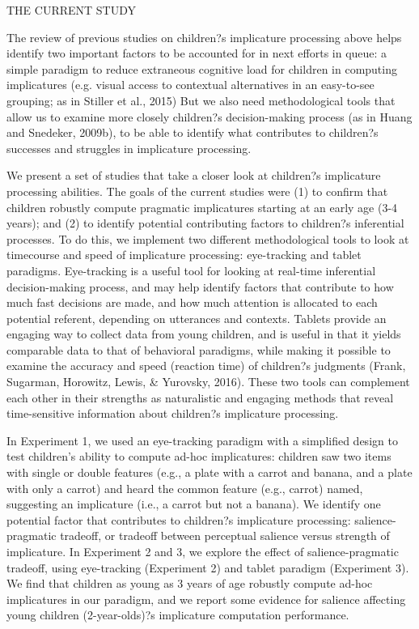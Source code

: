 THE CURRENT STUDY

The review of previous studies on children?s implicature processing above helps identify two important factors to be accounted for in next efforts in queue: a simple paradigm to reduce extraneous cognitive load for children in computing implicatures (e.g. visual access to contextual alternatives in an easy-to-see grouping; as in Stiller et al., 2015) But we also need methodological tools that allow us to examine more closely children?s decision-making process (as in Huang and Snedeker, 2009b), to be able to identify what contributes to children?s successes and struggles in implicature processing. 

We present a set of studies that take a closer look at children?s implicature processing abilities. The goals of the current studies were (1) to confirm that children robustly compute pragmatic implicatures starting at an early age (3-4 years); and (2) to identify potential contributing factors to children?s inferential processes. To do this, we implement two different methodological tools to look at timecourse and speed of implicature processing: eye-tracking and tablet paradigms. Eye-tracking is a useful tool for looking at real-time inferential decision-making process, and may help identify factors that contribute to how much fast decisions are made, and how much attention is allocated to each potential referent, depending on utterances and contexts. Tablets provide an engaging way to collect data from young children, and is useful in that it yields comparable data to that of behavioral paradigms, while making it possible to examine the accuracy and speed (reaction time) of children?s judgments (Frank, Sugarman, Horowitz, Lewis, & Yurovsky, 2016). These two tools can complement each other in their strengths as naturalistic and engaging methods that reveal time-sensitive information about children?s implicature processing.

In Experiment 1, we used an eye-tracking paradigm with a simplified design to test children's ability to compute ad-hoc implicatures: children saw two items with single or double features (e.g., a plate with a carrot and banana, and a plate with only a carrot) and heard the common feature (e.g., carrot) named, suggesting an implicature (i.e., a carrot but not a banana). We identify one potential factor that contributes to children?s implicature processing: salience-pragmatic tradeoff, or tradeoff between perceptual salience versus strength of implicature. In Experiment 2 and 3, we explore the effect of salience-pragmatic tradeoff, using eye-tracking (Experiment 2) and tablet paradigm (Experiment 3). We find that children as young as 3 years of age robustly compute ad-hoc implicatures in our paradigm, and we report some evidence for salience affecting young children (2-year-olds)?s implicature computation performance.

